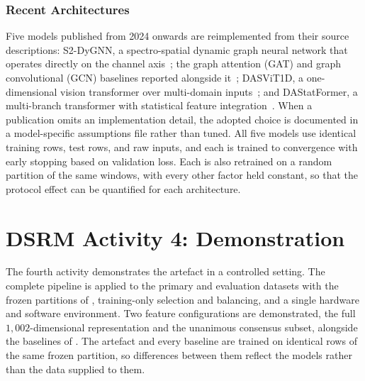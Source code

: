 \subsubsection{Recent Architectures}
\label{sec:chap3SOTA}
Five models published from 2024 onwards are reimplemented from their source descriptions: S2-DyGNN, a spectro-spatial dynamic graph neural network that operates directly on the channel axis~\cite{jeong2026s2dygnn}; the graph attention (GAT) and graph convolutional (GCN) baselines reported alongside it~\cite{jeong2026s2dygnn,shahabudin2024gnn}; DASViT1D, a one-dimensional vision transformer over multi-domain inputs~\cite{dione2025intrusion}; and DAStatFormer, a multi-branch transformer with statistical feature integration~\cite{dione2026dastatformer}. When a publication omits an implementation detail, the adopted choice is documented in a model-specific assumptions file rather than tuned. All five models use identical training rows, test rows, and raw inputs, and each is trained to convergence with early stopping based on validation loss. Each is also retrained on a random partition of the same windows, with every other factor held constant, so that the protocol effect can be quantified for each architecture.

\section{DSRM Activity 4: Demonstration}
\label{sec:chap3DSRMDemonstration}
The fourth activity demonstrates the artefact in a controlled setting. The complete pipeline is applied to the primary and evaluation datasets with the frozen partitions of , training-only selection and balancing, and a single hardware and software environment. Two feature configurations are demonstrated, the full $1{,}002$-dimensional representation and the unanimous consensus subset, alongside the baselines of . The artefact and every baseline are trained on identical rows of the same frozen partition, so differences between them reflect the models rather than the data supplied to them.

